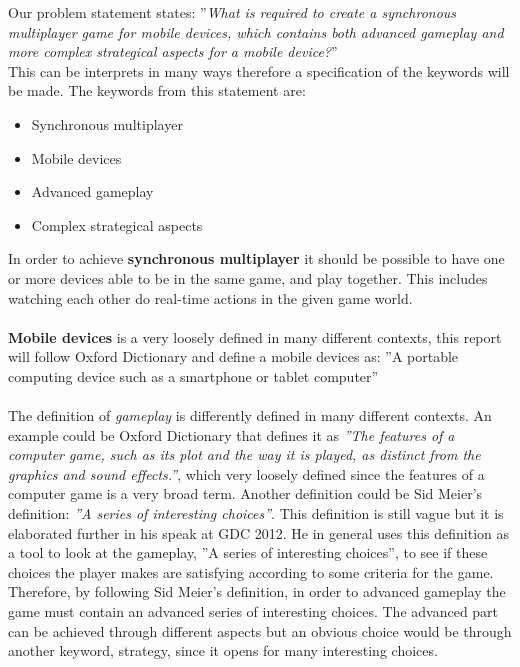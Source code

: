 Our problem statement states: ''\textit{What is required to create a synchronous multiplayer game for mobile devices, which contains both advanced
gameplay and more complex strategical aspects for a mobile device?}''\\
This can be interprets in many ways therefore a specification of the keywords will be made.
The keywords from this statement are:
\begin{itemize}
\item Synchronous multiplayer
\item Mobile devices
\item Advanced gameplay
\item Complex strategical aspects
\end{itemize}
In order to achieve \textbf{synchronous multiplayer} it should be possible to have one or more devices able to be in the same game, and play together. This includes watching each other do real-time actions in the given game world.\\\\
\textbf{Mobile devices} is a very loosely defined in many different contexts, this report will follow Oxford Dictionary and define a mobile devices as: ''A portable computing device such as a smartphone or tablet computer''\\\\
The definition of \textit{gameplay} is differently defined in many different contexts. An example could be Oxford Dictionary that defines it as \textit{''The features of a computer game, such as its plot and the way it is played, as distinct from the graphics and sound effects.''}, which very loosely defined since the features of a computer game is a very broad term. Another definition could be Sid Meier's definition: \textit{''A series of interesting choices''}. This definition is still vague but it is elaborated further in his speak at GDC 2012. 
He in general uses this definition as a tool to look at the gameplay, ''A series of interesting choices'', to see if these choices the player makes are satisfying according to some criteria for the game.\\
Therefore, by following Sid Meier's definition, in order to advanced gameplay the game must contain an advanced series of interesting choices.
The advanced part can be achieved through different aspects but an obvious choice would be through another keyword, strategy, since it opens for many interesting choices.\\\\
